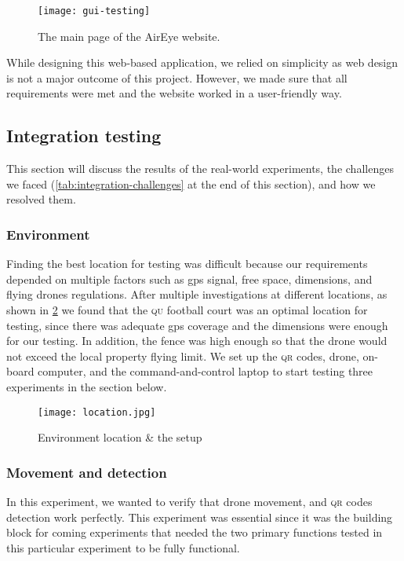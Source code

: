 \documentclass[../main.tex]{subfiles}
\begin{document}
\begin{figure}[tbp]
	\centering
	\texttt{[image: gui-testing]}
	\caption{The main page of the AirEye website.}
	\label{fig:gui-testing}
\end{figure}   

While designing this web-based application, we relied on simplicity as
web design is not a major outcome of this project. However, we made sure that 
all requirements were met and the website worked in a user-friendly way.


\subsection{Integration testing}

This section will discuss the results of the real-world experiments,
the challenges we faced (\cref{tab:integration-challenges} at the end
of this section), and
how we resolved them.

\subsubsection{Environment}

Finding the best location for testing was difficult
because our requirements depended on multiple factors 
such as \gls{gps} signal, free space, dimensions,
and flying drones regulations. After multiple investigations
at different locations, as shown in \cref{fig:testing-location}
we found that the \textsc{qu} football court was an optimal location
for testing, since there was adequate \gls{gps} coverage and the
dimensions were enough for our testing. 
In addition, the fence was high enough so that
the drone would not exceed the local property flying limit.
We set up the \textsc{qr} codes, drone, on-board computer, and the
command-and-control laptop to start testing three experiments in the
section below.

\begin{figure}[H]
	\centering
	\texttt{[image: location.jpg]}
	\caption{Environment location \& the setup}
	\label{fig:testing-location}
\end{figure} 

\subsubsection{Movement and detection}

In this experiment, we wanted to verify that drone movement, and
\textsc{qr} codes detection work perfectly. This experiment was 
essential since it was the building block for coming experiments
that needed the two primary functions tested in this particular
experiment to be fully functional.
\end{document}
